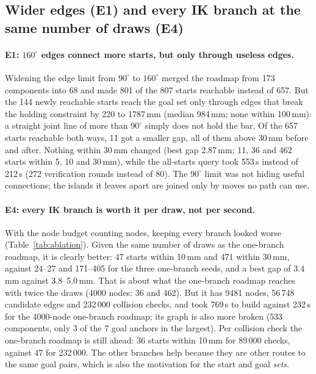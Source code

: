 \subsection{Wider edges (E1) and every IK branch at the same number of draws (E4)}
\label{sec:e1}

\begin{table}[h]
\centering
\footnotesize
\setlength{\tabcolsep}{3pt}
\caption{E1: the 4000-node roadmap rebuilt with edges of up to $160^\circ$ (same
seed, so the same sampled nodes; only the edges differ). E4: every IK branch kept,
given about the same number of draws (10\,848) as the default 2000-node roadmap
(10\,688 draws, one branch per draw), next to the earlier every-branch roadmap that
stopped at 2000 nodes (2272 draws).}
\label{tab:e1e4}

\end{table}

\paragraph{E1: $160^\circ$ edges connect more starts, but only through useless
edges.} Widening the edge limit from $90^\circ$ to $160^\circ$ merged the roadmap
from 173 components into 68 and made 801 of the 807 starts reachable instead of
657. But the 144 newly reachable starts reach the goal set only through edges that
break the holding constraint by 220 to 1787\,mm (median 984\,mm; none within
100\,mm): a straight joint line of more than $90^\circ$ simply does not hold the bar.
Of the 657 starts reachable both ways, 11 got a smaller gap, all of them above
30\,mm before and after. Nothing within 30\,mm changed (best gap 2.87\,mm; 11, 36
and 462 starts within 5, 10 and 30\,mm), while the all-starts query took 553\,s
instead of 212\,s (272 verification rounds instead of 80). The $90^\circ$ limit
was not hiding useful connections; the islands it leaves apart are joined only by
moves no path can use.
\label{sec:e4}

\paragraph{E4: every IK branch is worth it per draw, not per second.} With the node
budget counting nodes, keeping every branch looked worse (Table~\ref{tab:ablation}).
Given the same number of draws as the one-branch roadmap, it is clearly better: 47
starts within 10\,mm and 471 within 30\,mm, against 24--27 and 171--405 for the three
one-branch seeds, and a best gap of 3.4\,mm against 3.8--5.0\,mm. That is about what
the one-branch roadmap reaches with twice the draws (4000 nodes: 36 and 462). But it
has 9481 nodes, 56\,748 candidate edges and 232\,000 collision checks, and took
769\,s to build against 232\,s for the 4000-node one-branch roadmap; its graph is
also more broken (533 components, only 3 of the 7 goal anchors in the largest).
Per collision check the one-branch roadmap is still ahead: 36 starts within 10\,mm
for 89\,000 checks, against 47 for 232\,000. The other branches help because they
are other routes to the same goal pairs, which is also the motivation for the
start and goal \emph{sets}.

